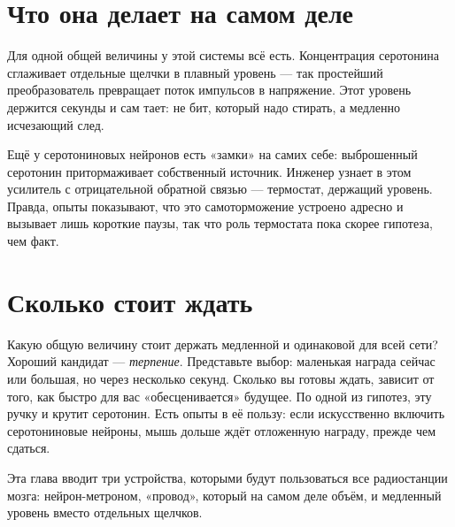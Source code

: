
\section*{Что она делает на самом деле}

Для одной общей величины у этой системы всё есть. Концентрация серотонина сглаживает отдельные щелчки в плавный уровень --- так простейший преобразователь превращает поток импульсов в напряжение. Этот уровень держится секунды и сам тает: не бит, который надо стирать, а медленно исчезающий след.

Ещё у серотониновых нейронов есть «замки» на самих себе: выброшенный серотонин притормаживает собственный источник. Инженер узнает в этом усилитель с отрицательной обратной связью --- термостат, держащий уровень. Правда, опыты показывают, что это самоторможение устроено адресно и вызывает лишь короткие паузы, так что роль термостата пока скорее гипотеза, чем факт.

\section*{Сколько стоит ждать}

Какую общую величину стоит держать медленной и одинаковой для всей сети? Хороший кандидат --- \emph{терпение}. Представьте выбор: маленькая награда сейчас или большая, но через несколько секунд. Сколько вы готовы ждать, зависит от того, как быстро для вас «обесценивается» будущее. По одной из гипотез, эту ручку и крутит серотонин. Есть опыты в её пользу: если искусственно включить серотониновые нейроны, мышь дольше ждёт отложенную награду, прежде чем сдаться.

Эта глава вводит три устройства, которыми будут пользоваться все радиостанции мозга: нейрон-метроном, «провод», который на самом деле объём, и медленный уровень вместо отдельных щелчков.

